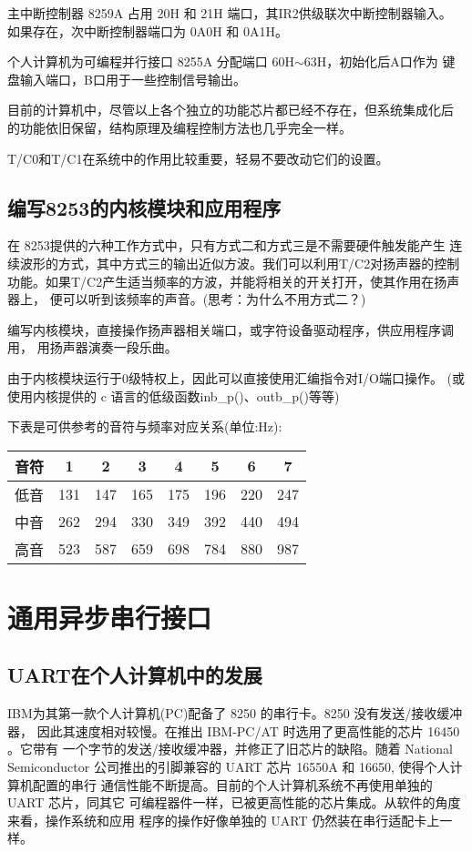 主中断控制器 8259A 占用 20H 和 21H 端口，其IR2供级联次中断控制器输入。
如果存在，次中断控制器端口为 0A0H 和 0A1H。

个人计算机为可编程并行接口 8255A 分配端口 60H$\sim$63H，初始化后A口作为
键盘输入端口，B口用于一些控制信号输出。

目前的计算机中，尽管以上各个独立的功能芯片都已经不存在，但系统集成化后
的功能依旧保留，结构原理及编程控制方法也几乎完全一样。

T/C0和T/C1在系统中的作用比较重要，轻易不要改动它们的设置。

\subsection{编写8253的内核模块和应用程序}
在 8253提供的六种工作方式中，只有方式二和方式三是不需要硬件触发能产生
连续波形的方式，其中方式三的输出近似方波。我们可以利用T/C2对扬声器的控制
功能。如果T/C2产生适当频率的方波，并能将相关的开关打开，使其作用在扬声器上，
便可以听到该频率的声音。(思考：为什么不用方式二？)

    编写内核模块，直接操作扬声器相关端口，或字符设备驱动程序，供应用程序调用，
用扬声器演奏一段乐曲。

    由于内核模块运行于0级特权上，因此可以直接使用汇编指令对I/O端口操作。
(或使用内核提供的 c 语言的低级函数inb\_p()、outb\_p()等等)

    下表是可供参考的音符与频率对应关系(单位:Hz):
\begin{table}[!h]
\centering\large
\begin{tabular}{|*8{|c}||} \hline
   音符 &  1  &  2  &  3  &  4  &  5  &  6  &  7\\\hline
   低音 & 131 & 147 & 165 & 175 & 196 & 220 & 247\\
   中音 & 262 & 294 & 330 & 349 & 392 & 440 & 494\\
   高音 & 523 & 587 & 659 & 698 & 784 & 880 & 987\\\hline
\end{tabular}
\end{table}

\section{通用异步串行接口}
\subsection{UART在个人计算机中的发展}
	IBM为其第一款个人计算机(PC)配备了 8250 的串行卡。8250 没有发送/接收缓冲器，
因此其速度相对较慢。在推出 IBM-PC/AT 时选用了更高性能的芯片 16450 。它带有
一个字节的发送/接收缓冲器，并修正了旧芯片的缺陷。随着 National Semiconductor
公司推出的引脚兼容的 UART 芯片 16550A 和 16650, 使得个人计算机配置的串行
通信性能不断提高。目前的个人计算机系统不再使用单独的 UART 芯片，同其它
可编程器件一样，已被更高性能的芯片集成。从软件的角度来看，操作系统和应用
程序的操作好像单独的 UART 仍然装在串行适配卡上一样。

